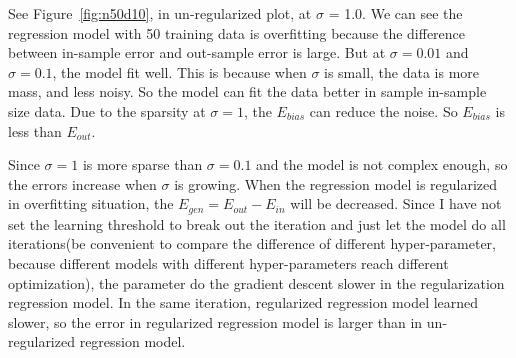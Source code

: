 \documentclass[12pt,letterpaper]{article}
\begin{document}
See Figure~\ref{fig:n50d10}, in un-regularized plot, at $\sigma$ = 1.0. We can see the regression model with 50 training data is overfitting because the difference between in-sample error and out-sample error is large. But at $\sigma=0.01$ and $\sigma=0.1$, the model fit well. This is because when $\sigma$ is small, the data is more mass, and less noisy. So the model can fit the data better in sample in-sample size data. Due to the sparsity at $\sigma=1$, the $E_{bias}$ can reduce the noise. So $E_{bias}$ is less than $E_{out}$.  

Since $\sigma=1$ is more sparse than $\sigma=0.1$ and the model is not complex enough, so the errors increase when $\sigma$ is growing. When the regression model is regularized in overfitting situation, the $E_{gen}=E_{out}-E_{in}$ will be decreased. Since I have not set the learning threshold to break out the iteration and just let the model do all iterations(be convenient to compare the difference of different hyper-parameter, because different models with different hyper-parameters reach different optimization), the parameter do the gradient descent slower in the regularization regression model. In the same iteration, regularized regression model learned slower, so the error in regularized regression model is larger than in un-regularized regression model. 
\end{document}
